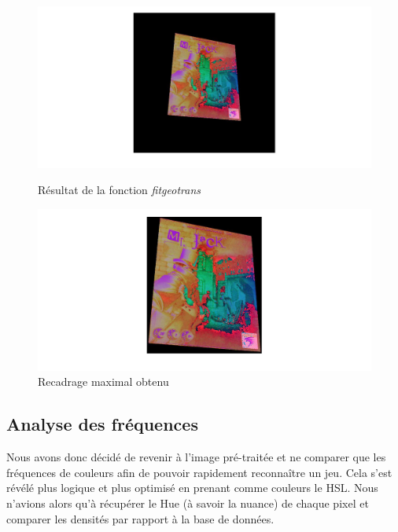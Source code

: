 \documentclass{st50_template}
\begin{document}
\begin{figure}[ht]
    \centering
    \begin{minipage}[b]{0.45\textwidth}
    \includegraphics[width=\textwidth]{images/fitgeotrans.jpg}
    \caption{Résultat de la fonction \emph{fitgeotrans}}
    \end{minipage}
    \hfill
    \begin{minipage}[b]{0.45\textwidth}
    \includegraphics[width=\textwidth]{images/transRecadre.jpg}
    \caption{Recadrage maximal obtenu}
    \end{minipage}
    \label{fitgeotrans}
\end{figure}

\subsection{Analyse des fréquences}

Nous avons donc décidé de revenir à l'image pré-traitée et ne comparer que les fréquences de couleurs afin de pouvoir rapidement reconnaître un jeu. Cela s'est révélé plus logique et plus optimisé en prenant comme couleurs le HSL. Nous n'avions alors qu'à récupérer le Hue (à savoir la nuance) de chaque pixel et comparer les densités par rapport à la base de données.
\end{document}

